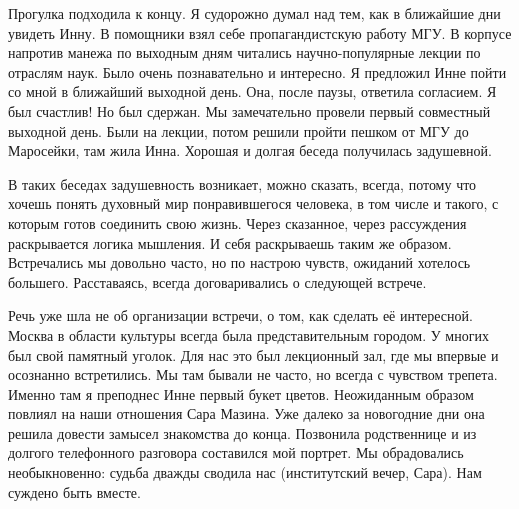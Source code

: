 \label{307-1}
Прогулка подходила к концу. Я судорожно думал над тем, как в ближайшие дни увидеть Инну. В помощники взял себе пропагандистскую работу МГУ. В корпусе напротив манежа по выходным дням читались научно-популярные лекции по отраслям наук. Было очень познавательно и интересно. Я предложил Инне пойти со мной в ближайший выходной день. Она, после паузы, ответила согласием. Я был счастлив! Но был сдержан. Мы замечательно провели первый совместный выходной день. Были на лекции, потом решили пройти пешком от МГУ до Маросейки, там жила Инна. Хорошая и долгая беседа получилась задушевной.

\label{308-1}
В таких беседах задушевность возникает, можно сказать, всегда, потому что хочешь понять духовный мир понравившегося человека, в том числе и такого, с которым готов соединить свою жизнь. Через сказанное, через рассуждения раскрывается логика мышления. И себя раскрываешь таким же образом. Встречались мы довольно часто, но по настрою чувств, ожиданий хотелось большего. Расставаясь, всегда договаривались о следующей встрече.

\label{309-1}
Речь уже шла не об организации встречи, о том, как сделать её интересной. Москва в области культуры всегда была представительным городом. У многих был свой памятный уголок. Для нас это был лекционный зал, где мы впервые и осознанно встретились. Мы там бывали не часто, но всегда с чувством трепета. Именно там я  преподнес Инне первый букет цветов. Неожиданным образом повлиял на наши отношения Сара Мазина. Уже далеко за новогодние дни она решила довести замысел знакомства до конца. Позвонила родственнице и из долгого телефонного разговора составился мой портрет. Мы обрадовались необыкновенно: судьба дважды сводила нас (институтский вечер, Сара). Нам суждено быть вместе.
